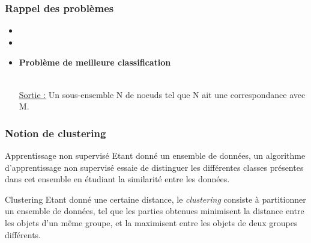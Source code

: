 \documentclass{beamer}
\begin{document}
\begin{frame}
\frametitle{Rappel des problèmes}

\begin{itemize}
\item {}
\item {}
\item \begin{flushcenter} \bf Problème de meilleure classification\end{flushcenter}\\ \uline{Sortie :} Un sous-ensemble N de noeuds tel que N ait une correspondance avec M.

\end{itemize}

\end{frame}

\begin{frame}
\frametitle{Notion de clustering}


\begin{block}{Apprentissage non supervisé}
Etant donné un ensemble de données, un algorithme d'\alert{apprentissage non supervisé} essaie de distinguer les différentes classes présentes dans cet ensemble en étudiant la similarité entre les données.
\end{block}



\begin{block}{Clustering}
Etant donné une certaine distance, le \alert{\it clustering} consiste à partitionner un ensemble de données, tel que les parties obtenues \alert{minimisent} la distance entre les objets d'un même groupe, et la \alert{maximisent} entre les objets de deux groupes différents.
\end{block}

\end{frame}
\end{document}
